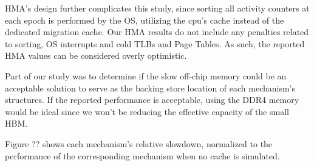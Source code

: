 HMA's design further complicates this study, since sorting all activity counters at each epoch is performed by the OS, utilizing the cpu's cache instead of the dedicated migration cache. Our HMA results do not include any penalties related to sorting, OS interrupts and cold TLBs and Page Tables. As such, the reported HMA values can be considered overly optimistic.

Part of our study was to determine if the slow off-chip memory could be an acceptable solution to serve as the backing store location of each mechanism's structures. If the reported performance is acceptable, using the DDR4 memory would be ideal since we won't be reducing the effective capacity of the small HBM.

Figure ?? shows each mechanism's relative slowdown, normalized to the performance of the corresponding mechanism when no cache is simulated. 

